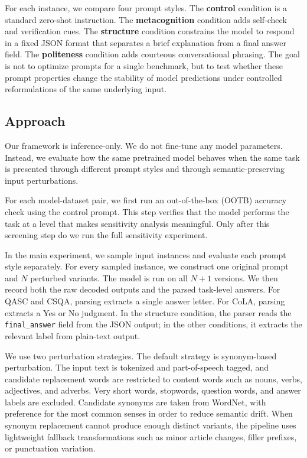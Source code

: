 \documentclass[11pt]{article}
\begin{document}
For each instance, we compare four prompt styles. The \textbf{control} condition is a standard zero-shot instruction. The \textbf{metacognition} condition adds self-check and verification cues. The \textbf{structure} condition constrains the model to respond in a fixed JSON format that separates a brief explanation from a final answer field. The \textbf{politeness} condition adds courteous conversational phrasing. The goal is not to optimize prompts for a single benchmark, but to test whether these prompt properties change the stability of model predictions under controlled reformulations of the same underlying input.

\subsection{Approach}

Our framework is inference-only. We do not fine-tune any model parameters. Instead, we evaluate how the same pretrained model behaves when the same task is presented through different prompt styles and through semantic-preserving input perturbations.

For each model-dataset pair, we first run an out-of-the-box (OOTB) accuracy check using the control prompt. This step verifies that the model performs the task at a level that makes sensitivity analysis meaningful. Only after this screening step do we run the full sensitivity experiment.

In the main experiment, we sample input instances and evaluate each prompt style separately. For every sampled instance, we construct one original prompt and $N$ perturbed variants. The model is run on all $N+1$ versions. We then record both the raw decoded outputs and the parsed task-level answers. For QASC and CSQA, parsing extracts a single answer letter. For CoLA, parsing extracts a Yes or No judgment. In the structure condition, the parser reads the \texttt{final\_answer} field from the JSON output; in the other conditions, it extracts the relevant label from plain-text output.

We use two perturbation strategies. The default strategy is synonym-based perturbation. The input text is tokenized and part-of-speech tagged, and candidate replacement words are restricted to content words such as nouns, verbs, adjectives, and adverbs. Very short words, stopwords, question words, and answer labels are excluded. Candidate synonyms are taken from WordNet, with preference for the most common senses in order to reduce semantic drift. When synonym replacement cannot produce enough distinct variants, the pipeline uses lightweight fallback transformations such as minor article changes, filler prefixes, or punctuation variation.
\end{document}
